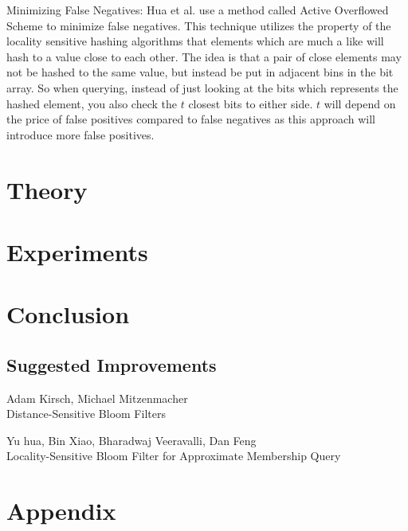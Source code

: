 \documentclass[a4paper,11pt]{article}
\begin{document}
Minimizing False Negatives:
Hua et al. use a method called Active Overflowed Scheme to minimize false negatives. This technique utilizes the property of the locality sensitive hashing algorithms that elements which are much a like will hash to a value close to each other. The idea is that a pair of close elements may not be hashed to the same value, but instead be put in adjacent bins in the bit array. So when querying, instead of just looking at the bits which represents the hashed element, you also check the $t$ closest bits to either side. $t$ will depend on the price of false positives compared to false negatives as this approach will introduce more false positives.

\section{Theory} %




\section{Experiments}



\section{Conclusion}
\subsection{Suggested Improvements}

\newpage

\begin{thebibliography}{}

Adam Kirsch, Michael Mitzenmacher\\
Distance-Sensitive Bloom Filters

Yu hua, Bin Xiao, Bharadwaj Veeravalli, Dan Feng\\
Locality-Sensitive Bloom Filter for Approximate Membership Query

\end{thebibliography}

\section*{Appendix}
%
\end{document}
